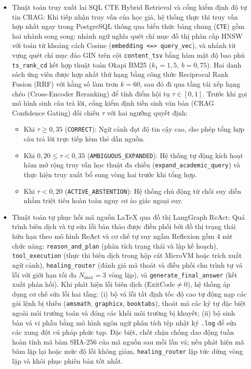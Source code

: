 \begin{itemize}
    \item Thuật toán truy xuất lai SQL CTE Hybrid Retrieval và cổng kiểm định độ tự tin CRAG:
    Khi tiếp nhận truy vấn của học giả, hệ thống thực thi truy vấn hợp nhất ngay trong PostgreSQL thông qua biểu thức bảng chung (\texttt{CTE}) gồm hai nhánh song song: nhánh ngữ nghĩa quét chỉ mục đồ thị phân cấp HNSW với toán tử khoảng cách Cosine (\texttt{embedding <=> query\_vec}), và nhánh từ vựng quét chỉ mục đảo GIN trên cột \texttt{content\_tsv} bằng hàm mật độ bao phủ \texttt{ts\_rank\_cd} kết hợp thuật toán Okapi BM25 ($k_1 = 1{,}5,\ b = 0{,}75$). Hai danh sách ứng viên được hợp nhất thứ hạng bằng công thức Reciprocal Rank Fusion (RRF) với hằng số làm trơn $k = 60$, sau đó đi qua tầng tái xếp hạng chéo (Cross-Encoder Reranking) để tính điểm hội tụ $\tau \in [0, 1]$. Trước khi gọi mô hình sinh câu trả lời, cổng kiểm định tiền sinh văn bản (CRAG Confidence Gating) đối chiếu $\tau$ với hai ngưỡng quyết định:
    \begin{itemize}[noitemsep, topsep=2pt]
        \item Khi $\tau \ge 0{,}35$ (\texttt{CORRECT}): Ngữ cảnh đạt độ tin cậy cao, cho phép tổng hợp câu trả lời trực tiếp kèm thẻ dẫn nguồn.
        \item Khi $0{,}20 \le \tau < 0{,}35$ (\texttt{AMBIGUOUS\_EXPANDED}): Hệ thống tự động kích hoạt hàm mở rộng truy vấn học thuật đa chiều (\texttt{expand\_\allowbreak academic\_\allowbreak query}) và thực hiện truy xuất bổ sung vòng hai trước khi tổng hợp.
        \item Khi $\tau < 0{,}20$ (\texttt{ACTIVE\_ABSTENTION}): Hệ thống chủ động từ chối suy diễn nhằm triệt tiêu hoàn toàn nguy cơ ảo giác ngoại suy.
    \end{itemize}

    \item Thuật toán tự phục hồi mã nguồn LaTeX qua đồ thị LangGraph ReAct:
    Quá trình biên dịch và tự sửa lỗi bản thảo được điều phối bởi đồ thị trạng thái hữu hạn theo mô hình ReAct và cơ chế tự suy ngẫm Reflexion gồm 4 nút chức năng: \texttt{reason\_and\_plan} (phân tích trạng thái và lập kế hoạch), \texttt{tool\_execution} (thực thi biên dịch trong hộp cát MicroVM hoặc trích xuất ngữ cảnh), \texttt{healing\_router} (đánh giá mã thoát và điều phối chu trình tự vá lỗi với giới hạn tối đa $N_{\max} = 3$ vòng lặp), và \texttt{generate\_final\_answer} (kết xuất phản hồi). Khi phát hiện lỗi biên dịch ($\text{ExitCode} \ne 0$), hệ thống áp dụng cơ chế sửa lỗi hai tầng: (i) bộ vá lỗi tất định tốc độ cao tự động nạp các gói lệnh bị thiếu (\texttt{amsmath}, \texttt{graphicx}, \texttt{booktabs}), thoát mã các ký tự đặc biệt ngoài môi trường toán và đóng các khối môi trường bị khuyết; (ii) bộ sinh bản vá vi phẫu bằng mô hình ngôn ngữ phân tích tệp nhật ký \texttt{.log} để sửa các xung đột cú pháp phức tạp. Đặc biệt, chốt chặn chống dao động tuần hoàn tính mã băm SHA-256 của mã nguồn sau mỗi lần vá; nếu phát hiện mã băm lặp lại hoặc mức độ lỗi không giảm, \texttt{healing\_router} lập tức dừng vòng lặp và khôi phục phiên bản tốt nhất.


\end{itemize}
